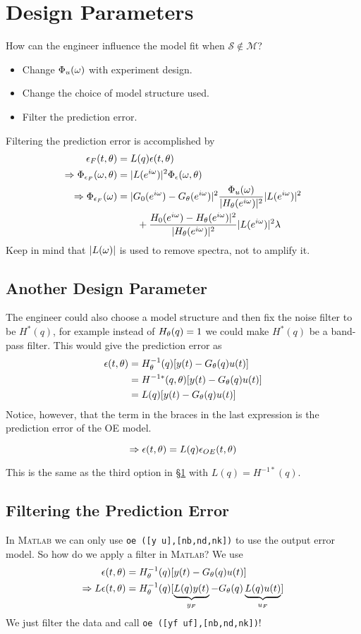 \section{Design Parameters}%
\label{sec:16dp}
How can the engineer influence the model fit when $\mathcal{S}\notin\mathcal{M}$?
\begin{itemize}
\item Change $\Phi_u(\omega)$ with experiment design.
\item Change the choice of model structure used.
\item Filter the prediction error.
\end{itemize}
Filtering the prediction error is accomplished by
\begin{align*}
\epsilon_F(t,\theta) &= L(q)\epsilon(t,\theta) \\
\Rightarrow \Phi_{\epsilon_F}(\omega,\theta) &= |L(e^{i\omega})|^2\Phi_\epsilon(\omega,\theta) \\
\Rightarrow \Phi_{\epsilon_F}(\omega) &= |G_0(e^{i\omega}) - G_\theta(e^{i\omega})|^2\frac{\Phi_u(\omega)}{|H_\theta(e^{i\omega})|^2}|L(e^{i\omega})|^2 \\
&\qquad + \frac{H_0(e^{i\omega}) - H_\theta(e^{i\omega})|^2}{|H_\theta(e^{i\omega})|^2}|L(e^{i\omega})|^2\lambda
\end{align*}
Keep in mind that $|L(\omega)|$ is used to remove spectra, not to amplify it.

\subsection{Another Design Parameter}
The engineer could also choose a model structure and then fix the noise filter to be $H^\ast(q)$, for example instead of $H_\theta(q)=1$ we could make $H^\ast(q)$ be a band-pass filter.
This would give the prediction error as
\begin{align*}
\epsilon(t,\theta) &= H_\theta^{-1} (q)[y(t)-G_\theta(q) u(t)] \\
&= H^{-1\ast}(q,\theta)[y(t) - G_\theta(q) u(t)] \\
&= L(q)[y(t) - G_\theta(q) u(t)]
\end{align*}
Notice, however, that the term in the braces in the last expression is the prediction error of the OE model.

\begin{equation*}
\Rightarrow \epsilon(t,\theta) = L(q)\epsilon_{OE}(t,\theta)
\end{equation*}

This is the same as the third option in \S\ref{sec:16dp} with $L(q)=H^{-1\ast}(q)$.

\subsection{Filtering the Prediction Error}
In \textsc{Matlab} we can only use \texttt{oe ([y u],[nb,nd,nk])} to use the output error model.
So how do we apply a filter in \textsc{Matlab}? We use
\begin{align*}
\epsilon(t,\theta) &= H_\theta^{-1} (q)[y(t)-G_\theta(q) u(t)] \\
\Rightarrow L\epsilon(t,\theta) &= H_\theta^{-1} (q)[\underbrace{L(q)y(t)}_{y_F} - G_\theta(q) \underbrace{L(q)u(t)}_{u_F}]
\end{align*}
We just filter the data and call \texttt{oe ([yf uf],[nb,nd,nk])}!

